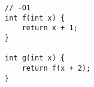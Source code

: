 \begin{lstlisting}[title=\href{https://godbolt.org/z/xPZPa2}{\texttt{godbolt.org/z/xPZPa2}}]
// -O1
int f(int x) {
    return x + 1;
}

int g(int x) {
    return f(x + 2);
}
\end{lstlisting}
